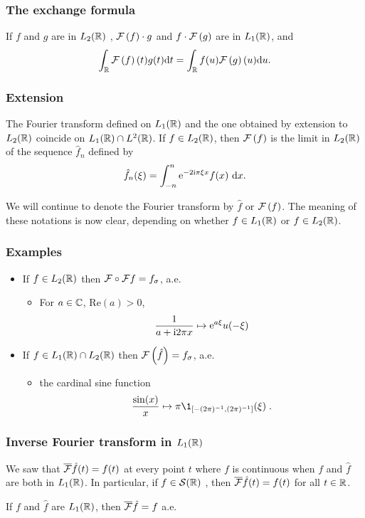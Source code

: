 \begin{frame}
\frametitle{The exchange formula}
\begin{theorem}
If $f$ and $g$  are in $L_2(\mathbb{R})$ , $\mathcal{F}\left( f \right) \cdot g$ and $f\cdot \mathcal{F}\left( g \right)$ are in $L_1(\mathbb{R})$, and
$$
\int_{\mathbb{R}} \mathcal{F}\left( f \right)(t)g(t) \mathrm{d} t=\int_{\mathbb{R}} f(u) \mathcal{F}\left( g \right)(u) \mathrm{d} u.
$$
\end{theorem}
\end{frame}



\begin{frame}
\frametitle{Extension}
\begin{theorem}
The Fourier transform defined on $L_1(\mathbb{R})$  and the one obtained by extension to $L_2(\mathbb{R})$  coincide on $L_1(\mathbb{R})\cap L^{2}(\mathbb{R})$. If $ f\in L_2(\mathbb{R})$,  then $\mathcal{F}\left( f \right)$  is the limit in $L_2(\mathbb{R})$  of the sequence $\hat{f}_{n}$ defined by
$$
\hat{f}_{n}(\xi)=\int_{-n}^{n} \mathrm{e}^{-2\mathrm{i} \pi\xi x}f(x)\ \mathrm{d} x.
$$
\end{theorem}
We will continue to denote the Fourier transform by $\hat{f}$ or $\mathcal{F}\left( f \right)$. The meaning of these notations is now clear, depending on whether $ f\in L_1(\mathbb{R})$ or $ f\in L_2(\mathbb{R})$.
\end{frame}

\begin{frame}
\frametitle{Examples}
\begin{itemize}
\item If $f \in L_2(\mathbb{R})$ then $\mathcal{F} \circ \mathcal{F} f= f_\sigma$, a.e.
\begin{itemize}
\item  For $a \in \mathbb{C}$, $\mathrm{Re}(a) > 0$,
\[
\frac{1}{a+ \mathrm{i} 2 \pi x} \mapsto \mathrm{e}^{a \xi} u(-\xi)
\]
\end{itemize}
\item If $f \in L_1(\mathbb{R}) \cap L_2(\mathbb{R})$ then $\mathcal{F}\left( \hat{f} \right)= f_\sigma$, a.e.
\begin{itemize}
\item  the cardinal sine function
\[
\frac{\sin(x)}{x} \mapsto \pi \1_{\ccint{-(2\pi)^{-1},(2\pi)^{-1}}}(\xi) \eqsp.
\]
\end{itemize}
\end{itemize}
\end{frame}

\begin{frame}
\frametitle{Inverse Fourier transform in $L_1(\mathbb{R})$}
We saw  that $\overline{\mathcal{F}} \hat{f}(t)=f(t)$ at every point $t$ where $f$ is continuous when $f$ and $\hat{f}$  are both in $L_1(\mathbb{R})$. In particular, if $ f\in \mathcal{S}(\mathbb{R})$ , then $\overline{\mathcal{F}} \hat{f}(t)=f(t)$ for all $ t\in \mathbb{R}$.

\begin{theorem}
If $f$ and $\hat{f}$ are $L_1(\mathbb{R})$, then $\overline{\mathcal{F}} \hat{f}=f$ a.e.
\end{theorem}
\end{frame}


